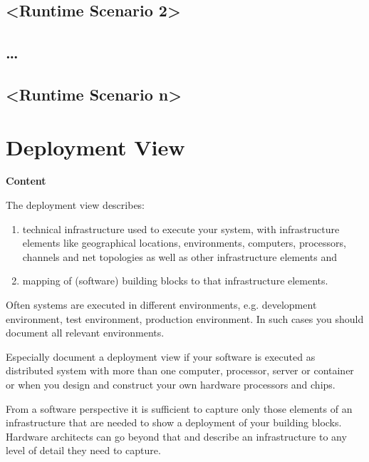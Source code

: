 \documentclass[
]{article}
\begin{document}
\hypertarget{__runtime_scenario_2}{%
\subsection{\textless Runtime Scenario
2\textgreater{}}\label{__runtime_scenario_2}}

\hypertarget{_}{%
\subsection{\ldots{}}\label{_}}

\hypertarget{__runtime_scenario_n}{%
\subsection{\textless Runtime Scenario
n\textgreater{}}\label{__runtime_scenario_n}}

\hypertarget{section-deployment-view}{%
\section{Deployment View}\label{section-deployment-view}}

\textbf{Content}

The deployment view describes:

\begin{enumerate}
\def\labelenumi{\arabic{enumi}.}
\item
  technical infrastructure used to execute your system, with
  infrastructure elements like geographical locations, environments,
  computers, processors, channels and net topologies as well as other
  infrastructure elements and
\item
  mapping of (software) building blocks to that infrastructure elements.
\end{enumerate}

Often systems are executed in different environments, e.g. development
environment, test environment, production environment. In such cases you
should document all relevant environments.

Especially document a deployment view if your software is executed as
distributed system with more than one computer, processor, server or
container or when you design and construct your own hardware processors
and chips.

From a software perspective it is sufficient to capture only those
elements of an infrastructure that are needed to show a deployment of
your building blocks. Hardware architects can go beyond that and
describe an infrastructure to any level of detail they need to capture.
\end{document}
